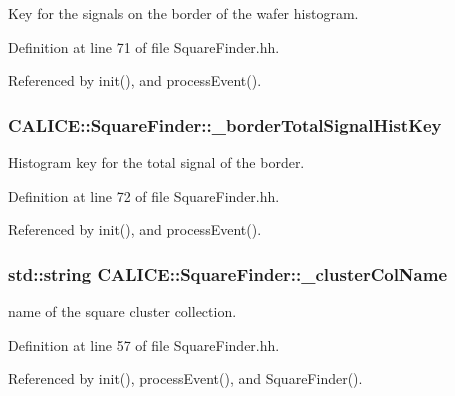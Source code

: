 Key for the signals on the border of the wafer histogram. 



Definition at line 71 of file Square\-Finder.\-hh.



Referenced by init(), and process\-Event().

\subsubsection[{\-\_\-border\-Total\-Signal\-Hist\-Key}]{ C\-A\-L\-I\-C\-E\-::\-Square\-Finder\-::\-\_\-border\-Total\-Signal\-Hist\-Key\hspace{0.3cm}{\ttfamily [private]}}\label{classCALICE_1_1SquareFinder_ad5d86613cf035e9e159bf25c735d3a9e}


Histogram key for the total signal of the border. 



Definition at line 72 of file Square\-Finder.\-hh.



Referenced by init(), and process\-Event().

\subsubsection[{\-\_\-cluster\-Col\-Name}]{\setlength{\rightskip}{0pt plus 5cm}std\-::string C\-A\-L\-I\-C\-E\-::\-Square\-Finder\-::\-\_\-cluster\-Col\-Name\hspace{0.3cm}{\ttfamily [protected]}}\label{classCALICE_1_1SquareFinder_ad92613a91542bc47728aa0b37b46ea09}


name of the square cluster collection. 



Definition at line 57 of file Square\-Finder.\-hh.



Referenced by init(), process\-Event(), and Square\-Finder().

